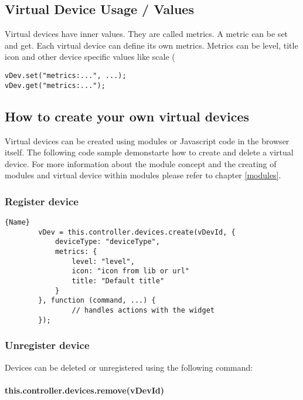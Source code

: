 \subsection{Virtual Device Usage / Values}

Virtual devices have inner values. They are called metrics. A metric can be set and get. 
Each virtual device can define its own metrics. Metrics can be level, title icon and 
other device specific values like scale (%

\begin{lstlisting}
vDev.set("metrics:...", ...);  
vDev.get("metrics:...");
\end{lstlisting}


\subsection{How to create your own virtual devices}

Virtual devices can be created using modules or Javascript code in the browser itself. 
The following code sample demonstarte how to create and delete a virtual device. For more 
information about the module concept and the creating of modules and virtual device within 
modules please refer to chapter \ref{modules}.

\subsubsection{Register device}

\begin{lstlisting}[caption=Register Device]{Name} 
        vDev = this.controller.devices.create(vDevId, {
            deviceType: "deviceType",
            metrics: {
                level: "level",
                icon: "icon from lib or url"
                title: "Default title"
            }
        }, function (command, ...) {
                // handles actions with the widget
        });  
\end{lstlisting}

\subsubsection{Unregister device}

Devices can be deleted or unregistered  using the following command:

\paragraph{this.controller.devices.remove(vDevId)}

